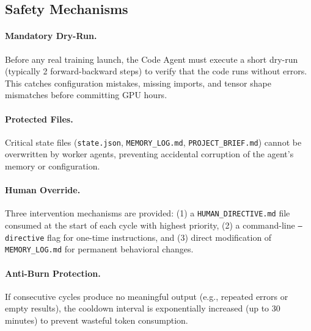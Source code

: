 \subsection{Safety Mechanisms}
\label{sec:safety}

\paragraph{Mandatory Dry-Run.} Before any real training launch, the Code Agent must execute a short dry-run (typically 2 forward-backward steps) to verify that the code runs without errors. This catches configuration mistakes, missing imports, and tensor shape mismatches before committing GPU hours.

\paragraph{Protected Files.} Critical state files (\texttt{state.json}, \texttt{MEMORY\_LOG.md}, \texttt{PROJECT\_BRIEF.md}) cannot be overwritten by worker agents, preventing accidental corruption of the agent's memory or configuration.

\paragraph{Human Override.} Three intervention mechanisms are provided: (1) a \texttt{HUMAN\_DIRECTIVE.md} file consumed at the start of each cycle with highest priority, (2) a command-line \texttt{--directive} flag for one-time instructions, and (3) direct modification of \texttt{MEMORY\_LOG.md} for permanent behavioral changes.

\paragraph{Anti-Burn Protection.} If consecutive cycles produce no meaningful output (e.g., repeated errors or empty results), the cooldown interval is exponentially increased (up to 30 minutes) to prevent wasteful token consumption.

